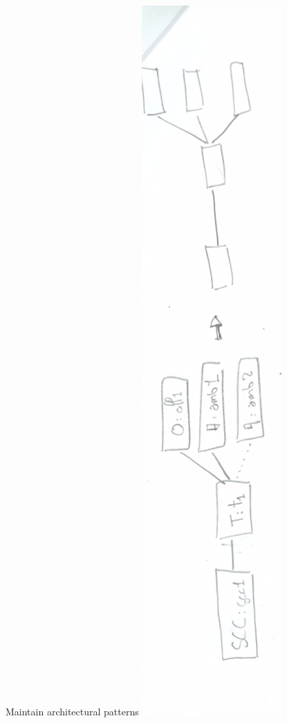 \documentclass{beamer}
\begin{document}
\begin{frame}{Maintain architectural patterns}
\includegraphics[angle=-90, scale=0.4]{cas-maintain-pattern}
\end{frame}
\end{document}
